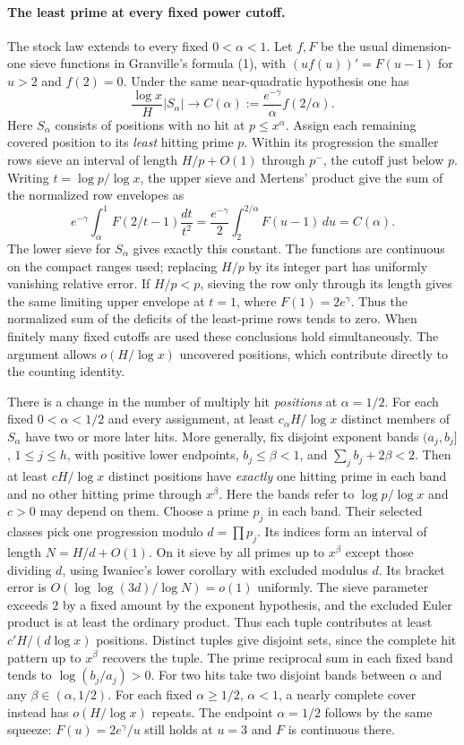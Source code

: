 \documentclass[11pt]{article}
\begin{document}
\paragraph{The least prime at every fixed power cutoff.}
The stock law extends to every fixed $0<\alpha<1$. Let $f,F$ be
the usual dimension-one sieve functions in Granville's formula (1),
with $(u f(u))'=F(u-1)$ for $u>2$ and $f(2)=0$. Under the same
near-quadratic hypothesis one has
\[
 \frac{\log x}{H}|S_\alpha|
      \longrightarrow C(\alpha):=\frac{e^{-\gamma}}{\alpha}f(2/\alpha).
\]
Here $S_\alpha$ consists of positions with no hit at $p\le x^\alpha$.
Assign each remaining covered position to its \emph{least} hitting
prime $p$. Within its progression the smaller rows sieve an interval
of length $H/p+O(1)$ through $p^-$, the cutoff just below $p$.
Writing $t=\log p/\log x$, the upper sieve and Mertens' product give
the sum of the normalized row envelopes as
\[
 e^{-\gamma}\int_\alpha^1 F(2/t-1)\frac{dt}{t^2}
   =\frac{e^{-\gamma}}2\int_2^{2/\alpha} F(u-1)\,du
   =C(\alpha).
\]
The lower sieve for $S_\alpha$ gives exactly this constant.
The functions are continuous on the compact ranges used; replacing
$H/p$ by its integer part has uniformly vanishing relative error.
If $H/p<p$, sieving the row only through its length gives the same
limiting upper envelope at $t=1$, where $F(1)=2e^\gamma$.
Thus the normalized sum of the deficits of the least-prime rows
tends to zero. When finitely many fixed cutoffs are used these
conclusions hold simultaneously. The argument allows $o(H/\log x)$
uncovered positions, which contribute directly to the counting identity.

There is a change in the number of multiply hit \emph{positions} at
$\alpha=1/2$. For each fixed $0<\alpha<1/2$ and every assignment,
at least $c_\alpha H/\log x$ distinct members of $S_\alpha$ have
two or more later hits. More generally, fix disjoint exponent bands
$(a_j,b_j]$, $1\le j\le h$, with positive lower endpoints,
$b_j\le\beta<1$, and $\sum_j b_j+2\beta<2$. Then at least
$cH/\log x$ distinct positions have \emph{exactly} one hitting prime
in each band and no other hitting prime through $x^\beta$.
Here the bands refer to $\log p/\log x$ and $c>0$ may depend on them.
Choose a prime $p_j$ in each band. Their selected classes pick one
progression modulo $d=\prod p_j$. Its indices form an interval of
length $N=H/d+O(1)$. On it sieve by all primes up to $x^\beta$
except those dividing $d$, using Iwaniec's lower corollary with
excluded modulus $d$. Its bracket error is
$O(\log\log(3d)/\log N)=o(1)$ uniformly. The sieve parameter
exceeds $2$ by a fixed amount by the exponent hypothesis, and the
excluded Euler product is at least the ordinary product. Thus each
tuple contributes at least $c'H/(d\log x)$ positions. Distinct tuples
give disjoint sets, since the complete hit pattern up to $x^\beta$
recovers the tuple. The prime reciprocal sum in each fixed band
tends to $\log(b_j/a_j)>0$.
For two hits take two disjoint bands between $\alpha$ and any
$\beta\in(\alpha,1/2)$. For each fixed $\alpha\ge1/2$, $\alpha<1$, a nearly
complete cover instead has $o(H/\log x)$ repeats. The endpoint
$\alpha=1/2$ follows by the same squeeze: $F(u)=2e^\gamma/u$
still holds at $u=3$ and $F$ is continuous there.
\end{document}
